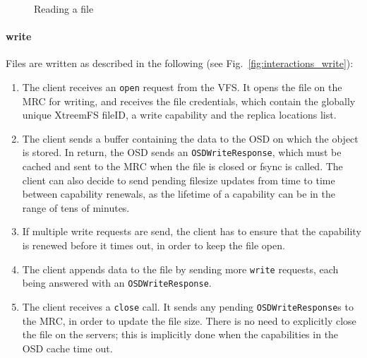 \begin{figure}[h!]
\centering
{}
\caption{Reading a file}
\label{fig:interactions_read}
\end{figure}

\paragraph{write}

Files are written as described in the following (see Fig.\ \ref{fig:interactions_write}):

\begin{enumerate}
 \item The client receives an \texttt{open} request from the VFS. It opens the file on the MRC for writing, and receives the file credentials, which contain the globally unique XtreemFS fileID, a write capability and the replica locations list.
 \item The client sends a buffer containing the data to the OSD on which the object is stored. In return, the OSD sends an \texttt{OSDWriteResponse}, which must be cached and sent to the MRC when the file is closed or fsync is called. The client can also decide to send pending filesize updates from time to time between capability renewals, as the lifetime of a capability can be in the range of tens of minutes.
 \item If multiple write requests are send, the client has to ensure that the capability is renewed before it times out, in order to keep the file open.
 \item The client appends data to the file by sending more \texttt{write} requests, each being answered with an \texttt{OSDWriteResponse}.
 \item The client receives a \texttt{close} call. It sends any pending \texttt{OSDWriteResponse}s to the MRC, in order to update the file size. There is no need to explicitly close the file on the servers; this is implicitly done when the capabilities in the OSD cache time out.
\end{enumerate}

